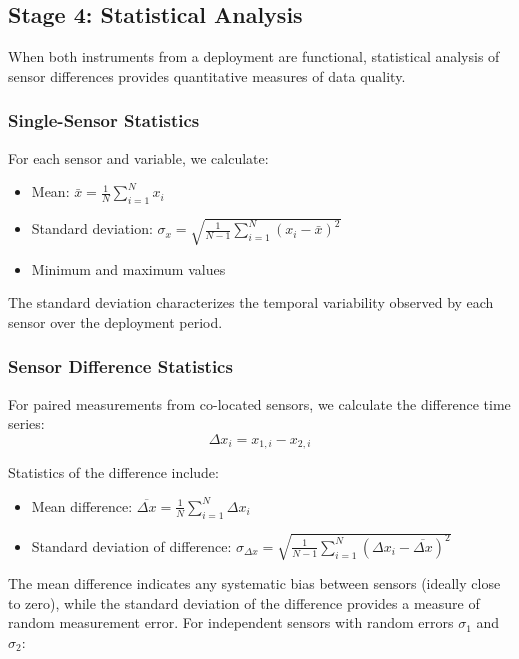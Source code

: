 \subsection{Stage 4: Statistical Analysis}

When both instruments from a deployment are functional, statistical analysis of sensor differences provides quantitative measures of data quality.

\subsubsection{Single-Sensor Statistics}

For each sensor and variable, we calculate:
\begin{itemize}
    \item Mean: $\bar{x} = \frac{1}{N}\sum_{i=1}^{N} x_i$
    \item Standard deviation: $\sigma_x = \sqrt{\frac{1}{N-1}\sum_{i=1}^{N} (x_i - \bar{x})^2}$
    \item Minimum and maximum values
\end{itemize}

The standard deviation characterizes the temporal variability observed by each sensor over the deployment period.

\subsubsection{Sensor Difference Statistics}

For paired measurements from co-located sensors, we calculate the difference time series:
\begin{equation}
\Delta x_i = x_{1,i} - x_{2,i}
\end{equation}

Statistics of the difference include:
\begin{itemize}
    \item Mean difference: $\overline{\Delta x} = \frac{1}{N}\sum_{i=1}^{N} \Delta x_i$
    \item Standard deviation of difference: $\sigma_{\Delta x} = \sqrt{\frac{1}{N-1}\sum_{i=1}^{N} (\Delta x_i - \overline{\Delta x})^2}$
\end{itemize}

The mean difference indicates any systematic bias between sensors (ideally close to zero), while the standard deviation of the difference provides a measure of random measurement error. For independent sensors with random errors $\sigma_1$ and $\sigma_2$:

